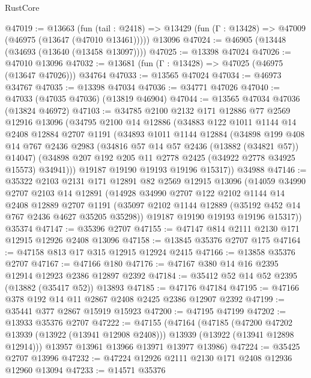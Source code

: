 \begin{lexlean}{RustCore}
\begin{coremodule}
@47019 := @13663
    (fun (tail : @2418) => @13429 (fun (Γ : @13428) => @47009 (@46975 (@13647 (@47010 @13461)))))
    @13096
@47024 := @46905 (@13448 (@34693 (@13640 (@13458 @13097))))
@47025 := @13398 @47024
@47026 := @47010 @13096
@47032 := @13681 (fun (Γ : @13428) => @47025 (@46975 (@13647 @47026))) @34764
@47033 := @13565 @47024
@47034 := @46973 @34767
@47035 := @13398 @47034
@47036 := @34771 @47026
@47040 := @47033 (@47035 @47036) (@13819 @46904)
@47044 := @13565 @47034 @47036 (@13824 @46972)
@47103 := @34785
    @2100
    @2132
    @171
    @12886
    @77
    @2569
    @12916
    @13096
    (@34795
      @2100
      @14
      @12886
      (@34883
        @122
        @1011
        @1144
        @14
        @2408
        @12884
        @2707
        @1191
        (@34893
          @1011
          @1144
          @12884
          (@34898
            @199
            @408
            @14
            @767
            @2436
            @2983
            (@34816 @57 @14 @57 @2436 (@13882 (@34821 @57)) @14047)
            (@34898 @207 @192 @205 @11 @2778 @2425 (@34922 @2778 @34925 @15573) @34941)))
        @19187
        @19190
        @19193
        @19196
        @15317))
    @34988
@47146 := @35322
    @2103
    @2131
    @171
    @12891
    @82
    @2569
    @12915
    @13096
    (@14059
      @34990
      @2707
      @2103
      @14
      @12891
      (@14928
        @34990
        @2707
        @122
        @2102
        @1144
        @14
        @2408
        @12889
        @2707
        @1191
        (@35097 @2102 @1144 @12889 (@35192 @452 @14 @767 @2436 @4627 @35205 @35298))
        @19187
        @19190
        @19193
        @19196
        @15317))
    @35374
@47147 := @35396 @2707
@47155 := @47147 @814 @2111 @2130 @171 @12915 @12926 @2408 @13096
@47158 := @13845 @35376 @2707 @175
@47164 := @47158 @813 @17 @315 @12915 @12924 @2415
@47166 := @13858 @35376 @2707
@47167 := @47166 @180
@47176 := @47167 @380 @14 @16 @2395 @12914 @12923 @2386 @12897 @2392
@47184 := @35412 @52 @14 @52 @2395 (@13882 (@35417 @52)) @13893
@47185 := @47176 @47184
@47195 := @47166 @378 @192 @14 @11 @2867 @2408 @2425 @2386 @12907 @2392
@47199 := @35441 @377 @2867 @15919 @15923
@47200 := @47195 @47199
@47202 := @13933 @35376 @2707
@47222 := @47155
    (@47164
      (@47185
        (@47200 @47202 @13939 (@13922 (@13941 @12908 @2408)))
        @13939
        (@13922 (@13941 @12898 @12914)))
      @13957
      @13961
      @13966
      @13971
      @13977
      @13986)
@47224 := @35425 @2707 @13996
@47232 := @47224 @12926 @2111 @2130 @171 @2408 @12936 @12960 @13094
@47233 := @14571 @35376

\end{coremodule}
\end{lexlean}
